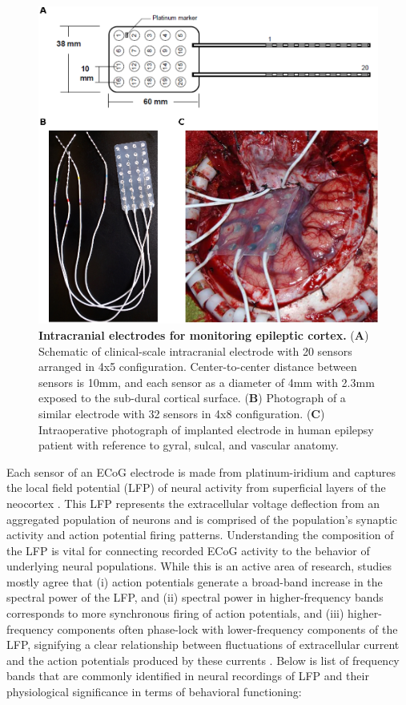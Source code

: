 \begin{figure}
\centering
\includegraphics[width=\textwidth]{intracranial_electrodes}
\caption[Implantation of intracranial electrodes]{\textbf{Intracranial electrodes for monitoring epileptic cortex.} (\textbf{A}) Schematic of clinical-scale intracranial electrode with 20 sensors arranged in 4x5 configuration. Center-to-center distance between sensors is 10mm, and each sensor as a diameter of 4mm with 2.3mm exposed to the sub-dural cortical surface. (\textbf{B}) Photograph of a similar electrode with 32 sensors in 4x8 configuration. (\textbf{C}) Intraoperative photograph of implanted electrode in human epilepsy patient with reference to gyral, sulcal, and vascular anatomy.}
\label{intracranial_electrodes}
\end{figure}

Each sensor of an ECoG electrode is made from platinum-iridium and captures the local field potential (LFP) of neural activity from superficial layers of the neocortex \cite{buzsaki2012origin}. This LFP represents the extracellular voltage deflection from an aggregated population of neurons and is comprised of the population's synaptic activity and action potential firing patterns. Understanding the composition of the LFP is vital for connecting recorded ECoG activity to the behavior of underlying neural populations. While this is an active area of research, studies mostly agree that (i) action potentials generate a broad-band increase in the spectral power of the LFP, and (ii) spectral power in higher-frequency bands corresponds to more synchronous firing of action potentials, and (iii) higher-frequency components often phase-lock with lower-frequency components of the LFP, signifying a clear relationship between fluctuations of extracellular current and the action potentials produced by these currents \cite{buzsaki2012origin}. Below is list of frequency bands that are commonly identified in neural recordings of LFP and their physiological significance in terms of behavioral functioning:


